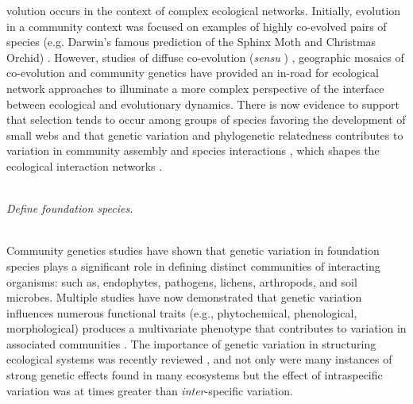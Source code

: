 \documentclass[11pt,twocolumn,twoside,lineno]{pnas-new}
\begin{document}
volution occurs in the context of complex ecological
networks. Initially, evolution in a community context was focused on
examples of highly co-evolved pairs of species (e.g. Darwin's famous
prediction of the Sphinx Moth and Christmas Orchid)
\cite{Wade2007TheCommunities}. However, studies of diffuse
co-evolution (\textit{sensu} \cite{Janzen1980SpecificityForest})
\cite{StinchcombeCanHerbivores, Strauss2008EvolutionSize}, geographic
mosaics of co-evolution \cite{Thompson2013} and community genetics
\cite{Whitham2006a} have provided an in-road for ecological network
approaches \cite{Smith2015b, Keith2017, Lau2016GenotypicEvolution} to
illuminate a more complex perspective of the interface between
ecological and evolutionary dynamics. There is now evidence to support
that selection tends to occur among groups of species
\cite{Wade2007TheCommunities} favoring the development of small webs
\cite{Guimaraes2007InteractionNetworks, Gomez2009LocalMosaic} and that
genetic variation and phylogenetic relatedness contributes to
variation in community assembly \cite{Crutsinger2016} and species
interactions \cite{Whitham2006a, Bailey2009a, Moya-Larano2011}, which
shapes the ecological interaction networks \cite{Rezende2007}.

\\

\textit{Define foundation species.}

\\

Community genetics studies \cite{Lamit2015a} have shown that genetic
variation in foundation species \cite{Ellison2005} plays a significant
role in defining distinct communities of interacting organisms:  such
as, endophytes, pathogens, lichens, arthropods, and soil
microbes. Multiple studies have now demonstrated that genetic
variation influences numerous functional traits (e.g., phytochemical,
phenological, morphological) produces a multivariate phenotype
\cite{holeski2012} that contributes to variation in associated
communities \cite{Bailey2009a}. The importance of genetic variation in
structuring ecological systems was recently reviewed
\cite{DesRoches2018TheVariation}, and not only were many instances of
strong genetic effects found in many ecosystems but the effect of
intraspecific variation was at times greater than
\textit{inter}-specific variation.
\end{document}
